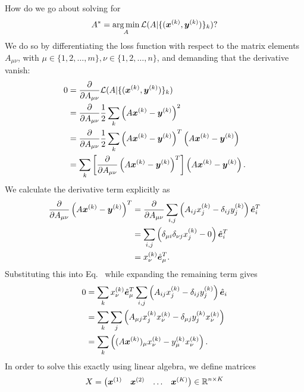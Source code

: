 \vspace{\baselineskip}
How do we go about solving for
%
\begin{equation}
    A^* = \operatorname*{arg\,min}_A \mathcal{L}(A | \{(\bm{x}^{(k)}, \bm{y}^{(k)})\}_k)?
\end{equation}
%
We do so by differentiating the loss function with respect to the matrix elements $A_{\mu\nu}$, with
$\mu \in \{1, 2, \dots, m\}, \nu \in \{1, 2, \dots, n\}$, and demanding that the derivative vanish:
%
\begin{align}
    \label{equation:l2-loss-minimization}
    0 &= \frac{\partial }{\partial A_{\mu\nu}} \mathcal{L}(A | \{(\bm{x}^{(k)}, \bm{y}^{(k)})\}_k) \nonumber\\
      &= \frac{\partial }{\partial A_{\mu\nu}} \frac{1}{2} \sum_k \left(A \bm{x}^{(k)} - \bm{y}^{(k)} \right)^2 \nonumber\\
      &= \frac{\partial }{\partial A_{\mu\nu}} \frac{1}{2} \sum_k \left(A \bm{x}^{(k)} - \bm{y}^{(k)} \right)^T \left(A \bm{x}^{(k)} - \bm{y}^{(k)} \right) \nonumber\\
      &= \sum_k \left[\frac{\partial }{\partial A_{\mu\nu}} \left(A \bm{x}^{(k)} - \bm{y}^{(k)} \right)^T \right] \left(A \bm{x}^{(k)} - \bm{y}^{(k)} \right).
\end{align}
%
We calculate the derivative term explicitly as
%
\begin{align}
    \frac{\partial }{\partial A_{\mu\nu}} \left(A \bm{x}^{(k)} - \bm{y}^{(k)} \right)^T &= \frac{\partial }{\partial A_{\mu\nu}} \sum_{i,j} \left(A_{ij} x^{(k)}_j - \delta_{ij} y^{(k)}_j \right)
                                                                 \hat{\bm{e}}^T_i \nonumber\\
        &= \sum_{i,j} \left(\delta_{\mu i} \delta_{\nu j} x^{(k)}_j - 0 \right) \hat{\bm{e}}^T_i \nonumber\\
        &= x^{(k)}_\nu \hat{\bm{e}}^T_\mu.
\end{align}
%
Substituting this into Eq.~ while expanding the remaining term gives
%
\begin{align}
    \label{equation:l2-loss-minimization-differentiated}
    0 &= \sum_k x^{(k)}_\nu \hat{\bm{e}}^T_\mu \sum_{i,j} \left(A_{ij} x^{(k)}_j - \delta_{ij} y^{(k)}_j \right) \hat{\bm{e}}_i \nonumber\\
      &= \sum_k \sum_{j} \left(A_{\mu j} x^{(k)}_j x^{(k)}_\nu - \delta_{\mu j} y^{(k)}_j x^{(k)}_\nu \right) \nonumber\\
      &= \sum_k \left((A \bm{x}^{(k)})_\mu x^{(k)}_\nu - y^{(k)}_\mu x^{(k)}_\nu \right).
\end{align}
%
In order to solve this exactly using linear algebra, we define matrices
%
\begin{equation}
    X = \begin{pmatrix}
        \bm{x}^{(1)} & \bm{x}^{(2)} & \dots & \bm{x}^{(K)}
    \end{pmatrix} \in \mathbb{R}^{n \times K}
\end{equation}
